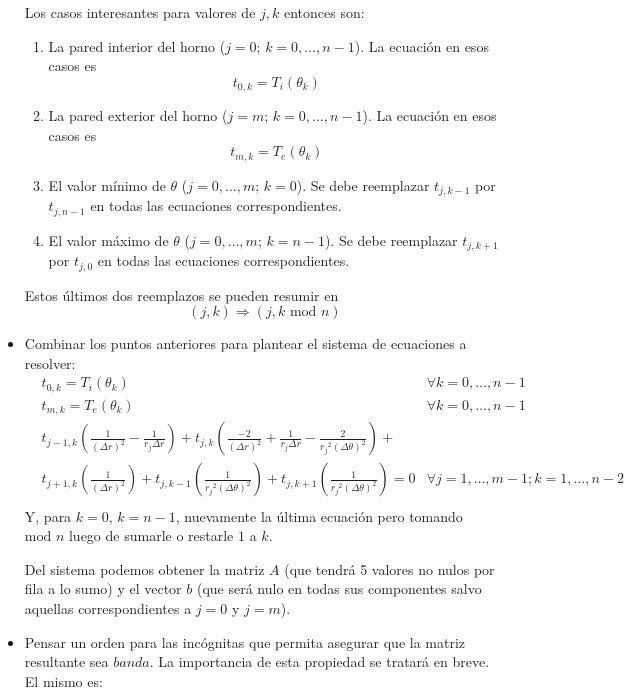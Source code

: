 \begin{itemize}
    Los casos interesantes para valores de $j, k$ entonces son:
    \begin{enumerate}
     \item La pared interior del horno ($j = 0$; $k = 0, \ldots, n-1$). La ecuación en esos casos es $$t_{0, k} = T_i(\theta_k)$$
     \item La pared exterior del horno ($j = m$; $k = 0, \ldots, n-1$). La ecuación en esos casos es $$t_{m, k} = T_e(\theta_k)$$
     \item El valor mínimo de $\theta$ ($j = 0, \ldots, m$; $k = 0$). Se debe reemplazar $t_{j, k-1}$ por $t_{j, n-1}$ en todas las ecuaciones correspondientes.
     \item El valor máximo de $\theta$ ($j = 0, \ldots, m$; $k = n-1$). Se debe reemplazar $t_{j, k+1}$ por $t_{j, 0}$ en todas las ecuaciones correspondientes.
    \end{enumerate}
    Estos últimos dos reemplazos se pueden resumir en $$(j, k) \Rightarrow (j, k \text{ mod } n)$$
 \item
    Combinar los puntos anteriores para plantear el sistema de ecuaciones a resolver:
    \begin{align*}\label{sistema}
    &t_{0, k} = T_i(\theta_k)                                           &\forall k = 0, \ldots, n-1  \\
    &t_{m, k} = T_e(\theta_k)                                           &\forall k = 0, \ldots, n-1  \\
    &   t_{j-1, k}\left(\frac{1}{(\Delta r)^2} - \frac{1}{r_j \Delta r}\right) + 
        t_{j, k}  \left(\frac{-2}{(\Delta r)^2} + \frac{1}{r_j \Delta r} - \frac{2}{{r_j}^2 (\Delta \theta)^2}\right) + \\
    &   t_{j+1, k}\left(\frac{1}{(\Delta r)^2}\right) + 
        t_{j, k-1}\left(\frac{1}{{r_j}^2(\Delta \theta)^2}\right) + 
        t_{j, k+1}\left(\frac{1}{{r_j}^2(\Delta \theta)^2}\right) = 0  &\forall j=1, \ldots, m-1; k = 1, \ldots , n-2 \\
    \end{align*}
    Y, para $k = 0$, $k = n-1$, nuevamente la última ecuación pero tomando $\text{mod } n$ luego de sumarle o restarle $1$ a $k$.
    
    Del sistema podemos obtener la matriz $A$ (que tendrá 5 valores no nulos por fila a lo sumo) y el vector $b$ (que será nulo en todas sus componentes salvo aquellas correspondientes a $j=0$ y $j=m$).
  \item
    Pensar un orden para las incógnitas que permita asegurar que la matriz resultante sea $banda$. La importancia de esta propiedad se tratará en breve. El mismo es:
    

\end{itemize}
